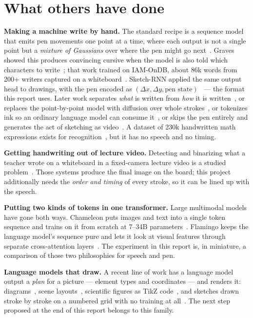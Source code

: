 \documentclass[11pt]{article}
\begin{document}
\section{What others have done}

\textbf{Making a machine write by hand.} The standard recipe is a sequence model that emits pen movements one point at a time, where each output is not a single point but a \emph{mixture of Gaussians} over where the pen might go next~\citep{bishop1994mdn}. Graves showed this produces convincing cursive when the model is also told which characters to write~\citep{graves2013generating}; that work trained on IAM-OnDB, about 86k words from 200+ writers captured on a whiteboard~\citep{liwicki2005iamondb}. Sketch-RNN applied the same output head to drawings, with the pen encoded as $(\Delta x, \Delta y, \text{pen state})$~\citep{ha2018sketchrnn} --- the format this report uses. Later work separates \emph{what} is written from \emph{how} it is written~\citep{aksan2018deepwriting}, or replaces the point-by-point model with diffusion over whole strokes~\citep{pan2026diffink,zhou2025strokefusion}, or tokenizes ink so an ordinary language model can consume it~\citep{wang2026scribetokens}, or skips the pen entirely and generates the act of sketching as video~\citep{ren2026videosketcher}. A dataset of 230k handwritten math expressions exists for recognition~\citep{gervais2024mathwriting}, but it has no speech and no timing.

\textbf{Getting handwriting out of lecture video.} Detecting and binarizing what a teacher wrote on a whiteboard in a fixed-camera lecture video is a studied problem~\citep{davila2017whiteboard,kota2019lecture}. Those systems produce the final image on the board; this project additionally needs the \emph{order and timing} of every stroke, so it can be lined up with the speech.

\textbf{Putting two kinds of tokens in one transformer.} Large multimodal models have gone both ways. Chameleon puts images and text into a single token sequence and trains on it from scratch at 7--34B parameters~\citep{chameleon2024}. Flamingo keeps the language model's sequence pure and lets it look at visual features through separate cross-attention layers~\citep{alayrac2022flamingo}. The experiment in this report is, in miniature, a comparison of those two philosophies for speech and pen.

\textbf{Language models that draw.} A recent line of work has a language model output a \emph{plan} for a picture --- element types and coordinates --- and renders it: diagrams~\citep{zala2024diagrammergpt}, scene layouts~\citep{feng2023layoutgpt}, scientific figures as TikZ code~\citep{belouadi2024automatikz}, and sketches drawn stroke by stroke on a numbered grid with no training at all~\citep{vinker2024sketchagent}. The next step proposed at the end of this report belongs to this family.
\end{document}
